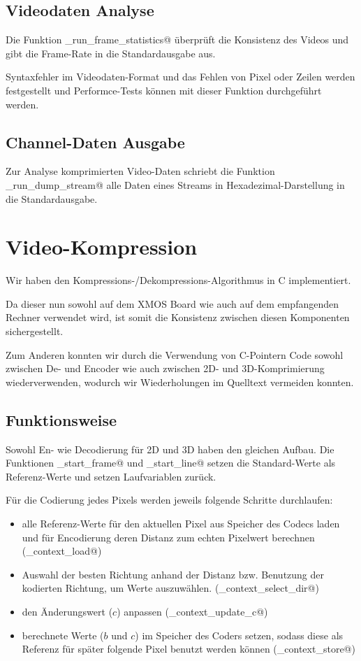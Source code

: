 \subsection{Videodaten Analyse}
Die Funktion \lstinline@tst_run_frame_statistics@ überprüft die Konsistenz des
Videos und gibt die Frame-Rate in die Standardausgabe aus.

Syntaxfehler im Videodaten-Format und das Fehlen von Pixel oder Zeilen 
werden festgestellt und Performce-Tests können mit dieser Funktion durchgeführt
werden.

\subsection{Channel-Daten Ausgabe}
Zur Analyse komprimierten Video-Daten schriebt die Funktion 
\lstinline@tst_run_dump_stream@ alle Daten eines Streams in
Hexadezimal-Darstellung in die Standardausgabe.


\section{Video-Kompression}

Wir haben den Kompressions-/Dekompressions-Algorithmus in C implementiert.

Da dieser nun sowohl auf dem XMOS Board wie auch auf dem empfangenden Rechner 
verwendet wird, ist somit die Konsistenz zwischen diesen Komponenten sichergestellt.

Zum Anderen konnten wir durch die Verwendung von C-Pointern Code sowohl zwischen 
De- und Encoder wie auch zwischen 2D- und 3D-Komprimierung wiederverwenden,
wodurch wir Wiederholungen im Quelltext vermeiden konnten.

\subsection{Funktionsweise}
Sowohl En- wie Decodierung für 2D und 3D haben den gleichen Aufbau.
Die Funktionen \lstinline@cmpr_start_frame@ und \lstinline@cmpr_start_line@
setzen die Standard-Werte als Referenz-Werte und setzen Laufvariablen zurück.

Für die Codierung jedes Pixels werden jeweils folgende Schritte durchlaufen:
\begin{itemize}
\item alle Referenz-Werte für den aktuellen Pixel aus Speicher des Codecs laden 
      und für Encodierung deren Distanz zum echten Pixelwert berechnen
	(\lstinline@cmpr_context_load@)
\item Auswahl der besten Richtung anhand der Distanz bzw. Benutzung
      der kodierten Richtung, um Werte auszuwählen.
	(\lstinline@cmpr_context_select_dir@)
\item den Änderungswert ($c$) anpassen
	(\lstinline@cmpr_context_update_c@)
\item berechnete Werte ($b$ und $c$) im Speicher des Coders setzen, sodass diese 
      als Referenz für später folgende Pixel benutzt werden können
	(\lstinline@cmpr_context_store@)
\end{itemize}

